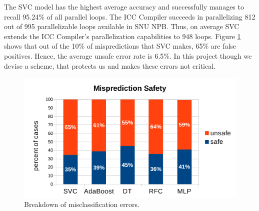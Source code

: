 The SVC model has the highest average accuracy and successfully manages to recall 95.24\% of all parallel loops. The ICC Compiler succeeds in parallelizing 812 out of 995 parallelizable loops available in SNU NPB. Thus, on average SVC extends the ICC Compiler's parallelization capabilities to 948 loops. Figure \ref{fig:prediction_stats} shows that out of the 10\% of mispredictions that SVC makes, 65\% are false positives. Hence, the average unsafe error rate is 6.5\%. In this project though we devise a scheme, that protects us and makes these errors not critical.
\begin{figure}[ht]
\includegraphics[width=1.0\textwidth]{images/prediction_stats.pdf}
\caption{Breakdown of misclassification errors.}
\label{fig:prediction_stats}
\vspace{-5mm}
\end{figure}
